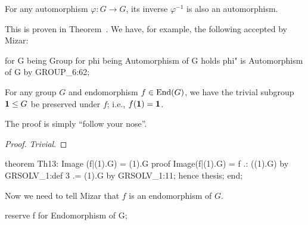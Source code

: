 \begin{proposition}
For any automorphism $\varphi\colon G\to G$, its inverse $\varphi^{-1}$
is also an automorphism.
\end{proposition}

This is proven in Theorem~. We have, for
example, the following accepted by Mizar:

\begin{mizar}
for G being Group
for phi being Automorphism of G
holds phi" is Automorphism of G by GROUP_6:62;
\end{mizar}

\begin{theorem}\label{thm:characteristic:automorphism:trivial-subgroup-invariant-under-automorphisms}
For any group $G$ and endomorphism $f\in\operatorname{End}(G)$, we have the trivial
subgroup $\mathbf{1}\leq G$ be preserved under $f$; i.e.,
$f(\mathbf{1})=\mathbf{1}$.
\end{theorem}

The proof is simply ``follow your nose''.

\begin{proof}
\emph{Trivial}.
\end{proof}

\nwenddocs{}\endmoddef\nwstartdeflinemarkup{}\nwenddeflinemarkup
theorem Th13:
  Image (f|(1).G) = (1).G
proof
  Image(f|(1).G) = f .: ((1).G) by GRSOLV_1:def 3
                .= (1).G by GRSOLV_1:11;
  hence thesis;
end;
\eatline
{}\nwendcode{}\nwdocspar
\begin{reserve}
Now we need to tell Mizar that $f$ is an endomorphism of $G$.
\end{reserve}

\nwenddocs{}\endmoddef\nwstartdeflinemarkup{}\nwenddeflinemarkup
reserve f for Endomorphism of G;
\nwendcode{}\nwdocspar

